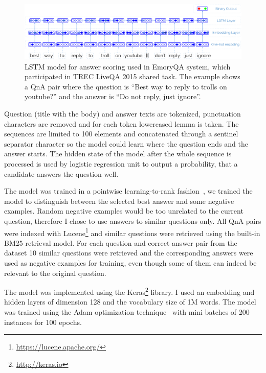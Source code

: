 \begin{figure}[t]
    \includegraphics[width=\textwidth]{img/liveqa_qa_lstm}
    \caption{LSTM model for answer scoring used in EmoryQA system, which participated in TREC LiveQA 2015 shared task. The example shows a QnA pair where the question is ``Best way to reply to trolls on youtube?'' and the answer is ``Do not reply, just ignore''.}
    \label{figure:non-factoid:system:lstm_model}
\end{figure}

Question (title with the body) and answer texts are tokenized, punctuation characters are removed and for each token lowercased lemma is taken.
The sequences are limited to 100 elements and concatenated through a sentinel separator character so the model could learn where the question ends and the answer starts.
The hidden state of the model after the whole sequence is processed is used by logistic regression unit to output a probability, that a candidate answers the question well.

The model was trained in a pointwise learning-to-rank fashion~\cite{liu2009learning}, \ie we trained the model to distinguish between the selected best answer and some negative examples.
Random negative examples would be too unrelated to the current question, therefore I chose to use answers to similar questions only.
All QnA pairs were indexed with Lucene\footnote{\href{url}{https://lucene.apache.org/}} and similar questions were retrieved using the built-in BM25 retrieval model.
For each question and correct answer pair from the dataset 10 similar questions were retrieved and the corresponding answers were used as negative examples for training, even though some of them can indeed be relevant to the original question.

The model was implemented using the Keras\footnote{\href{url}{http://keras.io}} library.
I used an embedding and hidden layers of dimension 128 and the vocabulary size of 1M words.
The model was trained using the Adam optimization technique~\cite{kingma2014adam} with mini batches of 200 instances for 100 epochs.

